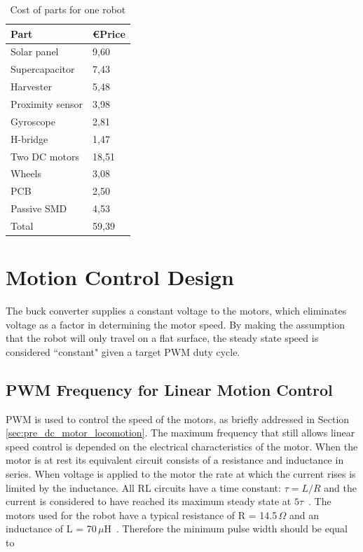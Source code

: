 \begin{table}[t]
	\centering
	\caption{Cost of parts for one robot}
	\label{tab:cost_robot}
	\begin{tabular}{|l|l|} 
		\hline
		Part & \euro Price \\
		\hline\hline
		Solar panel & 9,60\\
		Supercapacitor & 7,43\\
		Harvester & 5,48 \\
		Proximity sensor & 3,98 \\
		Gyroscope & 2,81\\	
		H-bridge & 1,47 \\
		Two DC motors & 18,51 \\
		Wheels & 3,08\\
		PCB & 2,50 \\
		Passive SMD & 4,53\\
		\hline \hline
		Total & 59,39 \\
		\hline
	\end{tabular}
\end{table}


\section{Motion Control Design}
\label{sec:dai_control_design}
The buck converter supplies a constant voltage to the motors, which eliminates voltage as a factor in determining the motor speed.
By making the assumption that the robot will only travel on a flat surface, the steady state speed is considered ``constant" given a target PWM duty cycle.

\subsection{PWM Frequency for Linear Motion Control}
\label{sec:cd_pwm_frequency}

PWM is used to control the speed of the motors, as briefly addressed in Section \ref{sec:pre_dc_motor_locomotion}.
The maximum frequency that still allows linear speed control is depended on the electrical characteristics of the motor.
When the motor is at rest its equivalent circuit consists of a resistance and inductance in series.
When voltage is applied to the motor the rate at which the current rises is limited by the inductance. 
All RL circuits have a time constant: $\tau = L / R$ and the current is considered to have reached its maximum steady state at $5\tau$~\cite{pmw_linear_motion_2017}. 
The motors used for the robot have a typical resistance of R = 14.5\,$\Omega$ and an inductance of L = 70\,$\mu$H~\cite{gearmotor_206-110_2017}.
Therefore the minimum pulse width should be equal to

